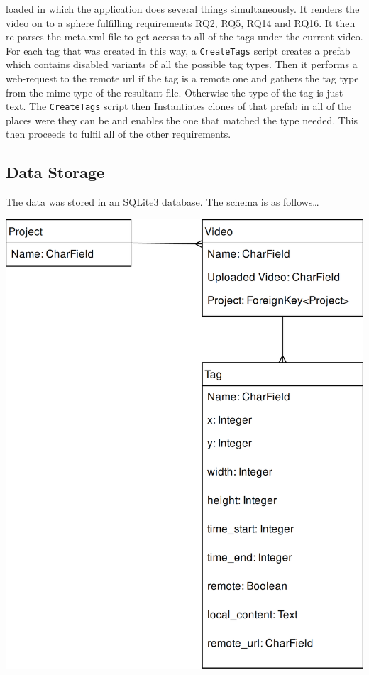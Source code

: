 \documentclass[12pt]{report}
\newcommand{\inlinecode}{\texttt}
\begin{document}
loaded in which the application does several things simultaneously. It renders
the video on to a sphere fulfilling requirements RQ2, RQ5, RQ14 and RQ16. It then
re-parses the meta.xml file to get access to all of the tags under the current
video. For each tag that was created in this way, a \inlinecode{CreateTags}
script creates a prefab which contains disabled variants of all the possible
tag types. Then it performs a web-request to the remote url if the tag is a
remote one and gathers the tag type from the mime-type of the resultant file.
Otherwise the type of the tag is just text. The \inlinecode{CreateTags} script
then Instantiates clones of that prefab in all of the places were they can be
and enables the one that matched the type needed. This then proceeds to fulfil
all of the other requirements.

\subsection{Data Storage}
The data was stored in an SQLite3 database. The schema is as follows\ldots

\includegraphics[height=\textwidth]{er_diagram}
\clearpage
\end{document}
